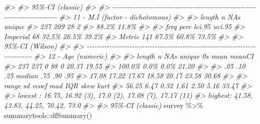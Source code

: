\documentclass[
]{book}
\newenvironment{Shaded}{\begin{snugshade}}{\end{snugshade}}
\newcommand{\CommentTok}[1]{\textcolor[rgb]{0.56,0.35,0.01}{\textit{#1}}}
\newcommand{\FunctionTok}[1]{\textcolor[rgb]{0.00,0.00,0.00}{#1}}
\newcommand{\NormalTok}[1]{#1}
\newcommand{\SpecialCharTok}[1]{\textcolor[rgb]{0.00,0.00,0.00}{#1}}
\begin{document}
\begin{Shaded}
\begin{Highlighting}[]
\CommentTok{\#\textgreater{} }
\CommentTok{\#\textgreater{} \textquotesingle{} 95\%{-}CI (classic)}
\CommentTok{\#\textgreater{} }
\CommentTok{\#\textgreater{} {-}{-}{-}{-}{-}{-}{-}{-}{-}{-}{-}{-}{-}{-}{-}{-}{-}{-}{-}{-}{-}{-}{-}{-}{-}{-}{-}{-}{-}{-}{-}{-}{-}{-}{-}{-}{-}{-}{-}{-}{-}{-}{-}{-}{-}{-}{-}{-}{-}{-}{-}{-}{-}{-}{-}{-}{-}{-}{-}{-}{-}{-}{-}{-}{-}{-}{-}{-}{-}{-}{-}{-}{-}{-}{-}{-}{-}{-} }
\CommentTok{\#\textgreater{} 11 {-} M.I (factor {-} dichotomous)}
\CommentTok{\#\textgreater{} }
\CommentTok{\#\textgreater{}   length      n    NAs unique}
\CommentTok{\#\textgreater{}      237    209     28      2}
\CommentTok{\#\textgreater{}           88.2\%  11.8\%       }
\CommentTok{\#\textgreater{} }
\CommentTok{\#\textgreater{}           freq   perc  lci.95  uci.95\textquotesingle{}}
\CommentTok{\#\textgreater{} Imperial    68  32.5\%   26.5\%   39.2\%}
\CommentTok{\#\textgreater{} Metric     141  67.5\%   60.8\%   73.5\%}
\CommentTok{\#\textgreater{} }
\CommentTok{\#\textgreater{} \textquotesingle{} 95\%{-}CI (Wilson)}
\CommentTok{\#\textgreater{} }
\CommentTok{\#\textgreater{} {-}{-}{-}{-}{-}{-}{-}{-}{-}{-}{-}{-}{-}{-}{-}{-}{-}{-}{-}{-}{-}{-}{-}{-}{-}{-}{-}{-}{-}{-}{-}{-}{-}{-}{-}{-}{-}{-}{-}{-}{-}{-}{-}{-}{-}{-}{-}{-}{-}{-}{-}{-}{-}{-}{-}{-}{-}{-}{-}{-}{-}{-}{-}{-}{-}{-}{-}{-}{-}{-}{-}{-}{-}{-}{-}{-}{-}{-} }
\CommentTok{\#\textgreater{} 12 {-} Age (numeric)}
\CommentTok{\#\textgreater{} }
\CommentTok{\#\textgreater{}   length       n    NAs  unique     0s   mean  meanCI\textquotesingle{}}
\CommentTok{\#\textgreater{}      237     237      0      88      0  20.37   19.55}
\CommentTok{\#\textgreater{}           100.0\%   0.0\%           0.0\%          21.20}
\CommentTok{\#\textgreater{}                                                      }
\CommentTok{\#\textgreater{}      .05     .10    .25  median    .75    .90     .95}
\CommentTok{\#\textgreater{}    17.08   17.22  17.67   18.58  20.17  23.58   30.68}
\CommentTok{\#\textgreater{}                                                      }
\CommentTok{\#\textgreater{}    range      sd  vcoef     mad    IQR   skew    kurt}
\CommentTok{\#\textgreater{}    56.25    6.47   0.32    1.61   2.50   5.16   33.47}
\CommentTok{\#\textgreater{}                                                      }
\CommentTok{\#\textgreater{} lowest : 16.75, 16.92 (3), 17.0 (2), 17.08 (7), 17.17 (11)}
\CommentTok{\#\textgreater{} highest: 41.58, 43.83, 44.25, 70.42, 73.0}
\CommentTok{\#\textgreater{} }
\CommentTok{\#\textgreater{} \textquotesingle{} 95\%{-}CI (classic)}
\NormalTok{survey }\SpecialCharTok{\%\textgreater{}\%}\NormalTok{ summarytools}\SpecialCharTok{::}\FunctionTok{dfSummary}\NormalTok{()}

\end{Highlighting}
\end{Shaded}
\end{document}

